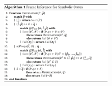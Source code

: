 
\begin{figure}
\includegraphics[width=0.48\textwidth]{figures/algorithm.png}
\vspace*{-1cm}
\end{figure}

